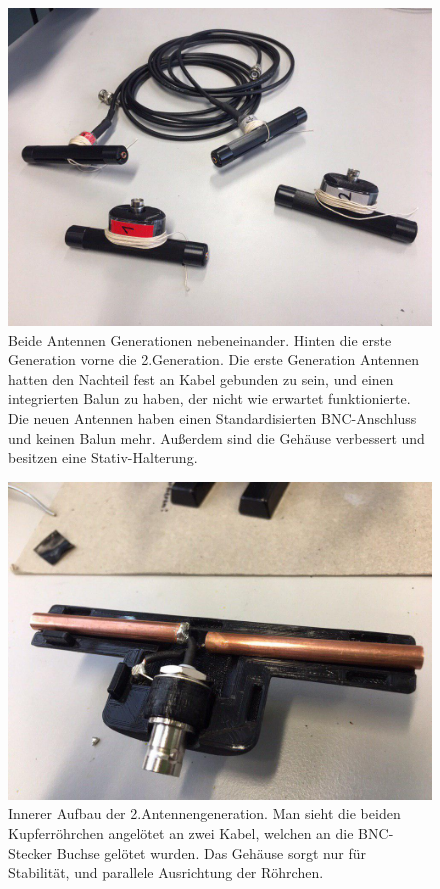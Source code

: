 \documentclass[titlepage,11pt,a4paper,ngerman]{article}
\begin{document}
\begin{figure}[ht]
	\centering
	\includegraphics[scale=0.3, trim={0cm 3cm 0cm 1cm}, clip]{Bilder/Ant_12}
	\caption{Beide Antennen Generationen nebeneinander. Hinten die erste Generation vorne die 2.Generation. Die erste Generation Antennen hatten den Nachteil fest an Kabel gebunden zu sein, und einen integrierten Balun zu haben, der nicht wie erwartet funktionierte. Die neuen Antennen haben einen Standardisierten BNC-Anschluss und keinen Balun mehr. Außerdem sind die Gehäuse verbessert und besitzen eine Stativ-Halterung.}
	\label{Antennen1u2}
\end{figure}
\begin{figure}[ht]
	\centering
	\includegraphics[scale=0.4, trim={0cm 0cm 0cm 8cm}, clip]{Bilder/Ant_innen_2}
	\caption{Innerer Aufbau der 2.Antennengeneration. Man sieht die beiden Kupferröhrchen angelötet an zwei Kabel, welchen an die BNC-Stecker Buchse gelötet wurden. Das Gehäuse sorgt nur für Stabilität, und parallele Ausrichtung der Röhrchen.}
	\label{Antenne2}
\end{figure}
\end{document}
